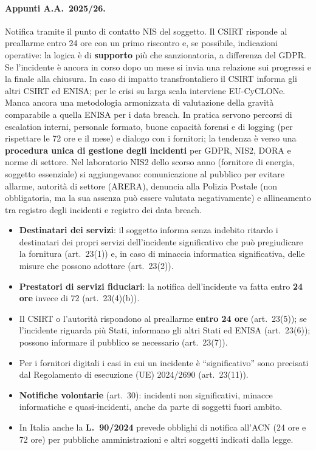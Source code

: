 \paragraph{Appunti A.A.~2025/26.} Notifica tramite il punto di contatto NIS del soggetto. Il CSIRT
risponde al preallarme entro 24 ore con un primo riscontro e, se possibile, indicazioni operative: la
logica è di \textbf{supporto} più che sanzionatoria, a differenza del GDPR. Se l'incidente è ancora in
corso dopo un mese si invia una relazione sui progressi e la finale alla chiusura. In caso di impatto
transfrontaliero il CSIRT informa gli altri CSIRT ed ENISA; per le crisi su larga scala interviene
EU-CyCLONe. Manca ancora una metodologia armonizzata di valutazione della gravità comparabile a quella
ENISA per i data breach. In pratica servono percorsi di escalation interni, personale formato, buone
capacità forensi e di logging (per rispettare le 72 ore e il mese) e dialogo con i fornitori; la
tendenza è verso una \textbf{procedura unica di gestione degli incidenti} per GDPR, NIS2, DORA e norme
di settore. Nel laboratorio NIS2 dello scorso anno (fornitore di energia, soggetto essenziale) si
aggiungevano: comunicazione al pubblico per evitare allarme, autorità di settore (ARERA), denuncia alla
Polizia Postale (non obbligatoria, ma la sua assenza può essere valutata negativamente) e
allineamento tra registro degli incidenti e registro dei data breach.

\begin{integrazione}
\begin{itemize}
  \item \textbf{Destinatari dei servizi}: il soggetto informa senza indebito ritardo i destinatari dei
    propri servizi dell'incidente significativo che può pregiudicare la fornitura (art.~23(1)) e, in
    caso di minaccia informatica significativa, delle misure che possono adottare (art.~23(2)).
  \item \textbf{Prestatori di servizi fiduciari}: la notifica dell'incidente va fatta entro
    \textbf{24 ore} invece di 72 (art.~23(4)(b)).
  \item Il CSIRT o l'autorità rispondono al preallarme \textbf{entro 24 ore} (art.~23(5)); se
    l'incidente riguarda più Stati, informano gli altri Stati ed ENISA (art.~23(6)); possono informare
    il pubblico se necessario (art.~23(7)).
  \item Per i fornitori digitali i casi in cui un incidente è ``significativo'' sono precisati dal
    Regolamento di esecuzione (UE) 2024/2690 (art.~23(11)).
  \item \textbf{Notifiche volontarie} (art.~30): incidenti non significativi, minacce informatiche e
    quasi-incidenti, anche da parte di soggetti fuori ambito.
  \item In Italia anche la \textbf{L.~90/2024} prevede obblighi di notifica all'ACN (24 ore e
    72 ore) per pubbliche amministrazioni e altri soggetti indicati dalla legge.
\end{itemize}
\end{integrazione}


